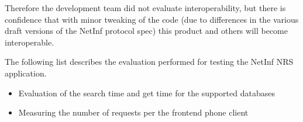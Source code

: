 Therefore the development team did not evaluate interoperability, but there is confidence that with minor tweaking of the code (due to differences in the various draft versions of the NetInf protocol spec) this product and others will become interoperable.

The following list describes the evaluation performed for testing the NetInf NRS application.

\begin{itemize}
\item Evaluation of the search time and get time for the supported databases
\item Measuring the number of requests per the frontend phone client
\end{itemize}
